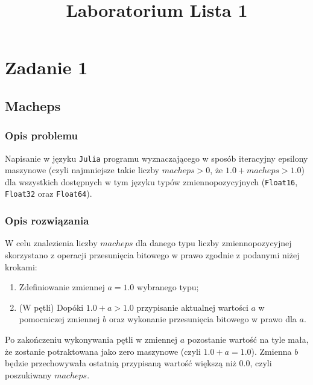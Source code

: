 \documentclass{classrep}
\author{
  \studentinfo{Agata Jasionowska}{229726}
}
\title{Laboratorium \ppauza Lista 1}
\begin{document}
\maketitle

\section{Zadanie 1}
	\subsection{Macheps}
		\subsubsection{Opis problemu}
			Napisanie w języku \texttt{Julia} programu wyznaczającego w sposób iteracyjny epsilony 
			maszynowe (czyli najmniejsze takie liczby $macheps > 0$, że $1.0 + macheps > 1.0$) 
			dla wszystkich dostępnych w tym języku typów zmiennopozycyjnych (\texttt{Float16},
			\texttt{Float32} oraz \texttt{Float64}).
		\subsubsection{Opis rozwiązania}
			W celu znalezienia liczby $macheps$ dla danego typu liczby zmiennopozycyjnej
			skorzystano	z operacji przesunięcia bitowego w prawo zgodnie z podanymi niżej krokami:
			\begin{enumerate}
				\item Zdefiniowanie zmiennej $a = 1.0$ wybranego typu;
				\item (W pętli) Dopóki $1.0 + a > 1.0$ przypisanie aktualnej wartości $a$ w pomocniczej 
				zmiennej $b$ oraz wykonanie przesunięcia bitowego w prawo dla $a$.
			\end{enumerate}
			Po zakończeniu wykonywania pętli w zmiennej $a$ pozostanie wartość na tyle
			mała, że zostanie potraktowana jako zero maszynowe (czyli $1.0 + a = 1.0$). Zmienna
			$b$ będzie przechowywała ostatnią przypisaną wartość większą niż $0.0$, czyli 
			poszukiwany $macheps$.
\end{document}
